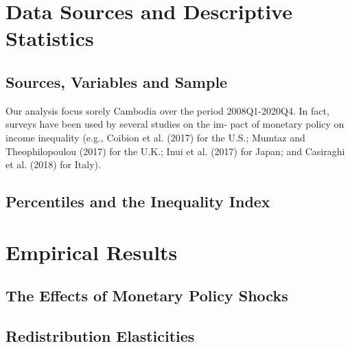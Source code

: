 \documentclass[11pt,letterpaper]{article}
\begin{document}
\section{Data Sources and Descriptive Statistics}\label{sec:data}
\subsection{Sources, Variables and Sample}	
Our analysis focus sorely Cambodia over the period 2008Q1-2020Q4. In fact, surveys have been used by several studies on the im- pact of monetary policy on income inequality (e.g., Coibion et al. (2017) for the U.S.; Mumtaz and Theophilopoulou (2017) for the U.K.; Inui et al. (2017) for Japan; and Casiraghi et al. (2018) for Italy).
\subsection{Percentiles and the Inequality Index}	

\section{Empirical Results}\label{sec:results}

\subsection{The Effects of Monetary Policy Shocks}

\subsection{Redistribution Elasticities}

\end{document}

